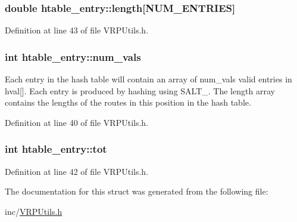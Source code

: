 \hypertarget{structhtable__entry_a6919b674abb5bf356a6438c3ee01d4a5}{
\subsubsection[{length}]{\setlength{\rightskip}{0pt plus 5cm}double {\bf htable\_\-entry::length}\mbox{[}NUM\_\-ENTRIES\mbox{]}}}
\label{structhtable__entry_a6919b674abb5bf356a6438c3ee01d4a5}


Definition at line 43 of file VRPUtils.h.

\hypertarget{structhtable__entry_a691d127bdbc4d9d881bc7a35fd5394b5}{
\subsubsection[{num\_\-vals}]{\setlength{\rightskip}{0pt plus 5cm}int {\bf htable\_\-entry::num\_\-vals}}}
\label{structhtable__entry_a691d127bdbc4d9d881bc7a35fd5394b5}
Each entry in the hash table will contain an array of num\_\-vals valid entries in hval\mbox{[}\mbox{]}. Each entry is produced by hashing using SALT\_. The length array contains the lengths of the routes in this position in the hash table. 

Definition at line 40 of file VRPUtils.h.

\hypertarget{structhtable__entry_aafae833bc59135f7185b753746e00fc0}{
\subsubsection[{tot}]{\setlength{\rightskip}{0pt plus 5cm}int {\bf htable\_\-entry::tot}}}
\label{structhtable__entry_aafae833bc59135f7185b753746e00fc0}


Definition at line 42 of file VRPUtils.h.



The documentation for this struct was generated from the following file:\begin{DoxyCompactItemize}
\item 
inc/\hyperlink{_v_r_p_utils_8h}{VRPUtils.h}\end{DoxyCompactItemize}
